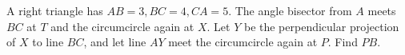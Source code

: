 A right triangle has $AB=3,BC=4,CA=5$. The angle bisector from $A$ meets $BC$ at $T$ and the circumcircle again at $X$. Let $Y$ be the perpendicular projection of $X$ to line $BC$, and let line $AY$ meet the circumcircle again at $P$. Find $PB$.
